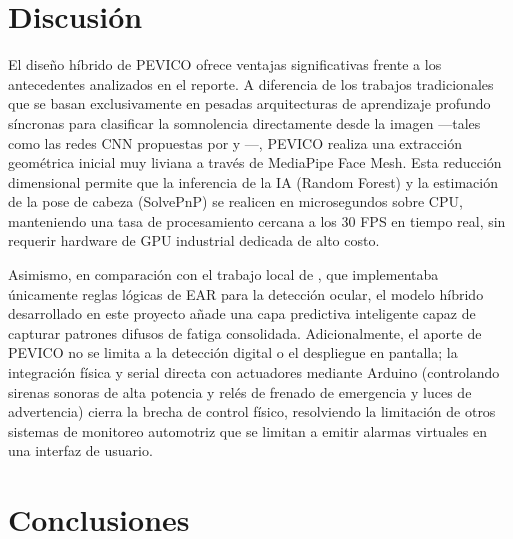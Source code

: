 \documentclass[conference]{IEEEtran}
\begin{document}
\section{Discusión}

El diseño híbrido de PEVICO ofrece ventajas significativas frente a los antecedentes analizados en el reporte. A diferencia de los trabajos tradicionales que se basan exclusivamente en pesadas arquitecturas de aprendizaje profundo síncronas para clasificar la somnolencia directamente desde la imagen ---tales como las redes CNN propuestas por \parencite{florez2023cnn} y \parencite{salman2021}---, PEVICO realiza una extracción geométrica inicial muy liviana a través de MediaPipe Face Mesh. Esta reducción dimensional permite que la inferencia de la IA (Random Forest) y la estimación de la pose de cabeza (SolvePnP) se realicen en microsegundos sobre CPU, manteniendo una tasa de procesamiento cercana a los 30 FPS en tiempo real, sin requerir hardware de GPU industrial dedicada de alto costo.

Asimismo, en comparación con el trabajo local de \parencite{crespin2019}, que implementaba únicamente reglas lógicas de EAR para la detección ocular, el modelo híbrido desarrollado en este proyecto añade una capa predictiva inteligente capaz de capturar patrones difusos de fatiga consolidada. Adicionalmente, el aporte de PEVICO no se limita a la detección digital o el despliegue en pantalla; la integración física y serial directa con actuadores mediante Arduino (controlando sirenas sonoras de alta potencia y relés de frenado de emergencia y luces de advertencia) cierra la brecha de control físico, resolviendo la limitación de otros sistemas de monitoreo automotriz que se limitan a emitir alarmas virtuales en una interfaz de usuario.

\section{Conclusiones}
\end{document}
